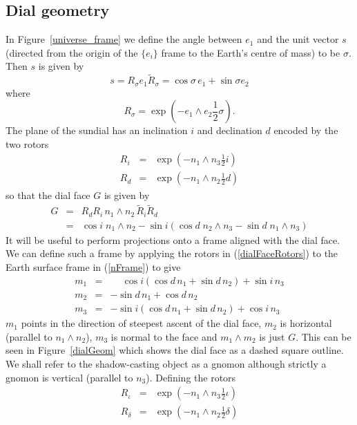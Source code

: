 \documentclass[12pt]{article}
\newcommand{\nn}{\nonumber}
\newcommand{\wdg}{\! \wedge \!}
\newcommand{\half}{{\textstyle \frac{1}{2}}}
\begin{document}
\subsection{Dial geometry}
%
In Figure~\ref{universe_frame} we define the angle between $e_1$ and the unit vector $s$ (directed from the origin of the $\{e_i\}$ frame to the Earth's centre of mass) to be $\sigma$. Then $s$ is given by
%
\begin{equation}
s = R_\sigma e_1 \tilde{R}_\sigma = \cos\sigma \, e_1 + \sin\sigma e_2
\end{equation}
%
where
%
\begin{equation}
R_\sigma = \exp(-e_1 \wdg e_2 \half\sigma).
\end{equation}
%
The plane of the sundial has an inclination $i$ and declination $d$ encoded by the two rotors
%
\begin{eqnarray} \label{dialFaceRotors}
R_i & = & \exp( - n_1 \wdg n_3 \half i ) \\ \nn
R_d & = & \exp( - n_1 \wdg n_2 \half d )
\end{eqnarray}
%
so that the dial face $G$ is given by
%
\begin{eqnarray}
G & = & R_d R_i \, n_1 \wdg n_2 \, \tilde{R}_i \tilde{R}_d \\ \nn
  & = & \cos i \; n_1 \wdg n_2 - \sin i ( \cos d \; n_2 \wdg n_3 - \sin d \; n_1 \wdg n_3 )
\end{eqnarray}
%
It will be useful to perform projections onto a frame aligned with the dial face. We can define such a frame by applying the rotors in (\ref{dialFaceRotors}) to the Earth surface frame in (\ref{nFrame}) to give
%
\begin{eqnarray} \label{mFrame}
m_1 & = & \phantom{-}\cos i (\cos d \, n_1 + \sin d \, n_2) + \sin i \, n_3\\ \nn
m_2 & = & -\sin d \,n_1 + \cos d \,n_2\\ \nn
m_3 & = & -\sin i (\cos d \, n_1 + \sin d \, n_2) + \cos i \, n_3
\end{eqnarray}
%
$m_1$ points in the direction of steepest ascent of the dial face, $m_2$ is horizontal (parallel to $n_1 \wdg n_2$), $m_3$ is normal to the face and  $m_1 \wdg m_2$ is just $G$. This can be seen in Figure~\ref{dialGeom} which shows the dial face as a dashed square outline.
%
We shall refer to the shadow-casting object as a gnomon although strictly a gnomon is vertical (parallel to $n_3$). Defining the rotors
%
\begin{eqnarray}
R_\iota & = & \exp( - n_1 \wdg n_3 \half \iota ) \\ \nn
R_\delta & = & \exp( - n_1 \wdg n_2 \half \delta )
\end{eqnarray}
\end{document}
